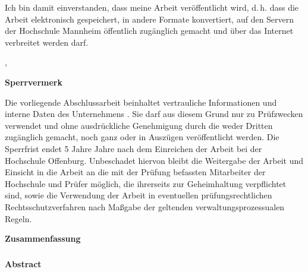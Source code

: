 %
{
\vspace{0.5cm}
Ich bin damit einverstanden, dass meine Arbeit veröffentlicht wird, d.\,h. dass die Arbeit elektronisch gespeichert, in andere Formate konvertiert, auf den Servern der Hochschule Mannheim öffentlich zugänglich gemacht und über das Internet verbreitet werden darf. 
}{}%


\vspace{1cm}
\hsmaort, \hsmadatum \\

\vspace{1.2cm}						                                      
\hsmaautor

%
{%
\vspace{5cm}
\color{red}\textsf{\large\textbf{Sperrvermerk}}

Die vorliegende Abschlussarbeit beinhaltet vertrauliche Informationen und interne Daten des Unternehmens \hsmafirma.
Sie darf aus diesem Grund nur zu Prüfzwecken verwendet und ohne ausdrückliche Genehmigung durch die \hsmafirma weder Dritten zugänglich gemacht, noch ganz oder in Auszügen veröffentlicht werden. Die Sperrfrist endet 5 Jahre Jahre nach dem Einreichen der Arbeit bei der Hochschule Offenburg. Unbeschadet hiervon bleibt die Weitergabe der Arbeit und Einsicht in die Arbeit an die mit der Prüfung befassten Mitarbeiter der Hochschule und Prüfer möglich, die ihrerseits zur Geheimhaltung verpflichtet sind, sowie die Verwendung der Arbeit in eventuellen prüfungsrechtlichen Rechtsschutzverfahren nach Maßgabe der geltenden verwaltungsprozessualen Regeln.
\color{black}
}{}

\cleardoublepage

\thispagestyle{empty}
\textsf{\large\textbf{Zusammenfassung}}
\subsubsection*{\hsmatitelde}\hsmaabstractde
\clearpage
\thispagestyle{empty}
\textsf{\large\textbf{Abstract}}
\subsubsection*{\hsmatitelen}\hsmaabstracten

